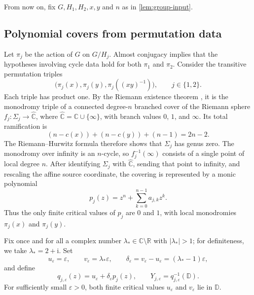 \documentclass[11pt,letterpaper,reqno]{amsart}
\theoremstyle{definition}
\newcommand{\D}{\mathbb D}
\newcommand{\C}{\mathbb C}
\newcommand{\R}{\mathbb R}
\newcommand{\iu}{\mathrm{i}}
\begin{document}
From now on, fix $G,H_1,H_2,x,y$ and $n$ as in
\cref{lem:group-input}.



\subsection{Polynomial covers from permutation data}

Let $\pi_j$ be the action of $G$ on $G/H_j$.  Almost conjugacy implies
that the hypotheses involving cycle data hold for both $\pi_1$ and
$\pi_2$.  Consider the transitive permutation triples
\[
\bigl(\pi_j(x),\pi_j(y),\pi_j((xy)^{-1})\bigr),
\qquad j\in\{1,2\}.
\]
Each triple has product one.  By the Riemann existence theorem
\cite{Forster1981}, it is the monodromy triple of a connected
degree-$n$ branched cover of the Riemann sphere
$f_j:\Sigma_j\longrightarrow\widehat{\C}$, where
$\widehat{\C}=\C\cup\{\infty\}$, with branch values $0$, $1$, and
$\infty$. Its total ramification is
\[
(n-c(x))+(n-c(y))+(n-1)=2n-2.
\]
The Riemann--Hurwitz formula therefore shows that $\Sigma_j$ has genus
zero.  The monodromy over infinity is an $n$-cycle, so
$f_j^{-1}(\infty)$ consists of a single point of local degree $n$.
After identifying $\Sigma_j$ with $\widehat{\C}$, sending that point
to infinity, and rescaling the affine source coordinate, the covering
is represented by a monic polynomial
\begin{equation}
p_j(z)=z^n+\sum_{k=0}^{n-1}a_{j,k}z^k.
\label{eq:general-polynomials}
\end{equation}
Thus the only finite critical values of $p_j$ are $0$ and $1$, with
local monodromies $\pi_j(x)$ and $\pi_j(y)$.









Fix once and for all a complex number
$\lambda_*\in\C\setminus\R$ with $|\lambda_*|>1$; for definiteness,
we take $\lambda_*=2+\iu$. Set
\[
u_\varepsilon=\varepsilon,
\qquad
v_\varepsilon=\lambda_*\varepsilon,
\qquad
\delta_\varepsilon=v_\varepsilon-u_\varepsilon
=(\lambda_*-1)\varepsilon,
\]
and define
\begin{equation}
q_{j,\varepsilon}(z)
=u_\varepsilon+\delta_\varepsilon p_j(z),
\qquad
Y_{j,\varepsilon}=q_{j,\varepsilon}^{-1}(\D).
\label{eq:general-rescaled-covers}
\end{equation}
For sufficiently small $\varepsilon>0$, both finite critical values
$u_\varepsilon$ and $v_\varepsilon$ lie in $\D$.
\end{document}
